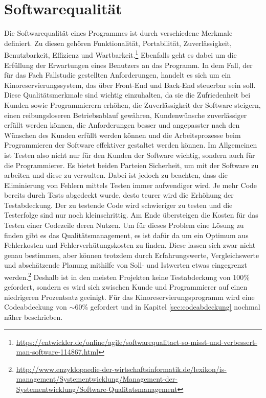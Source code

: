 \section{Softwarequalität}
\authorsection{\authorEJ}

Die Softwarequalität eines Programmes ist durch verschiedene Merkmale definiert.
Zu diesen gehören Funktionalität, Portabilität, Zuverlässigkeit, Benutzbarkeit, Effizienz und Wartbarkeit.\footnote{\url{https://entwickler.de/online/agile/softwarequalitaet-so-misst-und-verbessert-man-software-114867.html}}
Ebenfalls geht es dabei um die Erfüllung der Erwartungen eines Benutzers an das Programm.
In dem Fall, der für das Fach Fallstudie gestellten Anforderungen, handelt es sich um ein Kinoreservierungssystem, das über Front-End und Back-End steuerbar sein soll.
Diese Qualitätsmerkmale sind wichtig einzuhalten, da sie die Zufriedenheit bei Kunden sowie Programmierern erhöhen, die Zuverlässigkeit der Software steigern, einen reibungsloseren Betriebsablauf gewähren, Kundenwünsche zuverlässiger erfüllt werden können, die Anforderungen besser und angepasster nach den Wünschen des Kunden erfüllt werden können und die Arbeitsprozesse beim Programmieren der Software effektiver gestaltet werden können. %
Im Allgemeinen ist Testen also nicht nur für den Kunden der Software wichtig, sondern auch für die Programmierer.
Es bietet beiden Parteien Sicherheit, um mit der Software zu arbeiten und diese zu verwalten.
Dabei ist jedoch zu beachten, dass die Eliminierung von Fehlern mittels Testen immer aufwendiger wird.
Je mehr Code bereits durch Tests abgedeckt wurde, desto teurer wird die Erhöhung der Testabdeckung.
Der zu testende Code wird schwieriger zu testen und die Testerfolge sind nur noch kleinschrittig.
Am Ende übersteigen die Kosten für das Testen einer Codezeile deren Nutzen.
Um für dieses Problem eine Lösung zu finden gibt es das Qualitätsmanagement, es ist dafür da um ein Optimum aus Fehlerkosten und Fehlerverhütungskosten zu finden.
Diese lassen sich zwar nicht genau bestimmen, aber können trotzdem durch Erfahrungswerte, Vergleichswerte und abschätzende Planung mithilfe von Soll- und Istwerten etwas eingegrenzt werden.\footnote{\url{http://www.enzyklopaedie-der-wirtschaftsinformatik.de/lexikon/is-management/Systementwicklung/Management-der-Systementwicklung/Software-Qualitatsmanagement}}
Deshalb ist in den meisten Projekten keine Testabdeckung von 100\% gefordert, sondern es wird sich zwischen Kunde und Programmierer auf einen niedrigeren Prozentsatz geeinigt.
Für das Kinoreservierungsprogramm wird eine Codeabdeckung von $\sim$60\% gefordert und in Kapitel \vref{sec:codeabdeckung} nochmal näher beschrieben.
